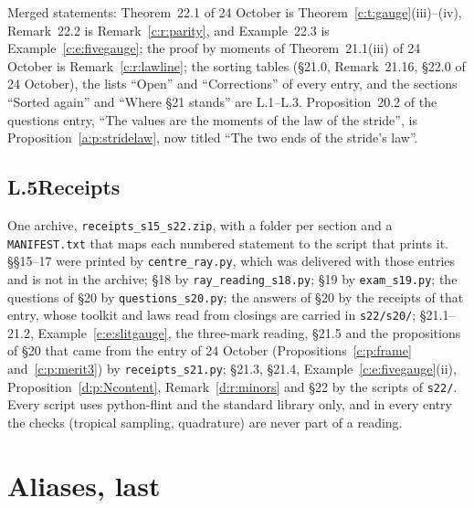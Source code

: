\documentclass[11pt]{article}
\theoremstyle{plain}
\theoremstyle{definition}
\theoremstyle{remark}
\begin{document}
\noindent Merged statements: Theorem~22.1 of 24 October is Theorem~\ref{c:t:gauge}(iii)--(iv), Remark~22.2 is Remark~\ref{c:r:parity}, and Example~22.3 is Example~\ref{c:e:fivegauge}; the proof by moments of Theorem~21.1(iii) of 24 October is Remark~\ref{c:r:lawline}; the sorting tables (\S21.0, Remark~21.16, \S22.0 of 24 October), the lists ``Open'' and ``Corrections'' of every entry, and the sections ``Sorted again'' and ``Where \S21 stands'' are L.1--L.3. Proposition~20.2 of the questions entry, ``The values are the moments of the law of the stride'', is Proposition~\ref{a:p:stridelaw}, now titled ``The two ends of the stride's law''.


\subsection*{L.5\quad Receipts}

One archive, \texttt{receipts\_s15\_s22.zip}, with a folder per section and a \texttt{MANIFEST.txt} that maps each numbered statement to the script that prints it. \S\S15--17 were printed by \texttt{centre\_ray.py}, which was delivered with those entries and is not in the archive; \S18 by \texttt{ray\_reading\_s18.py}; \S19 by \texttt{exam\_s19.py}; the questions of \S20 by \texttt{questions\_s20.py}; the answers of \S20 by the receipts of that entry, whose toolkit and laws read from closings are carried in \texttt{s22/s20/}; \S21.1--21.2, Example~\ref{c:e:slitgauge}, the three-mark reading, \S21.5 and the propositions of \S20 that came from the entry of 24 October (Propositions~\ref{c:p:frame} and~\ref{c:p:merit3}) by \texttt{receipts\_s21.py}; \S21.3, \S21.4, Example~\ref{c:e:fivegauge}(ii), Proposition~\ref{d:p:Ncontent}, Remark~\ref{d:r:minors} and \S22 by the scripts of \texttt{s22/}. Every script uses python-flint and the standard library only, and in every entry the checks (tropical sampling, quadrature) are never part of a reading.

\section*{Aliases, last}
\end{document}
